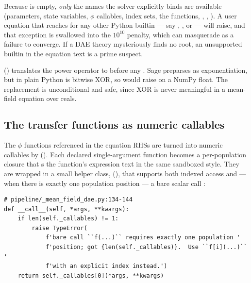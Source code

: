 \begin{gotcha}
Because  is empty, \emph{only} the names the solver
explicitly binds are available (parameters, state variables, $\phi$ callables,
index sets, the  functions, , ,
). A user equation that reaches for any other Python builtin --- say
, , or  --- will raise, and that exception is
swallowed into the $10^{10}$ penalty, which can masquerade as a failure to
converge. If a DAE theory mysteriously finds no root, an unsupported builtin in
the equation text is a prime suspect.
\end{gotcha}

\begin{note}
 () translates the power
operator \code{\^{}} to \code{**} before any . Sage preparses
\code{\^{}} as exponentiation, but in plain Python \code{\^{}} is bitwise XOR, so
 would raise  on a NumPy float. The replacement is unconditional and safe, since XOR
is never meaningful in a mean-field equation over reals.
\end{note}

\subsection{The transfer functions as numeric callables}

The $\phi$ functions referenced in the equation RHSs are turned into numeric
callables by  ().
Each declared single-argument function becomes a per-population closure that
s the function's expression text in the same sandboxed style. They are
wrapped in a small helper class, 
(), that supports both indexed access
 and --- when there is exactly one population position --- a bare
scalar call :

\begin{lstlisting}
# pipeline/_mean_field_dae.py:134-144
def __call__(self, *args, **kwargs):
    if len(self._callables) != 1:
        raise TypeError(
            f'bare call ``f(...)`` requires exactly one population '
            f'position; got {len(self._callables)}.  Use ``f[i](...)`` '
            f'with an explicit index instead.')
    return self._callables[0](*args, **kwargs)
\end{lstlisting}


